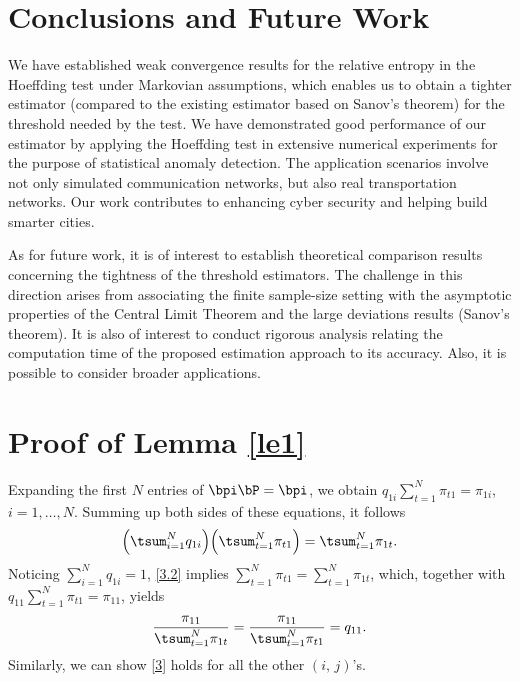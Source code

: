 \documentclass[10pt, twocolumn]{IEEEtran}
\begin{document}
\section{Conclusions and Future Work} \label{sec:con}

We have established weak convergence results for the relative entropy in
the Hoeffding test under Markovian assumptions, which enables us to
obtain a {tighter} estimator (compared to the existing estimator based on
Sanov's theorem) for the threshold needed by the test. We have
demonstrated good performance of our estimator by applying the Hoeffding
test in extensive numerical experiments for the purpose of statistical
anomaly detection. The application scenarios involve not only simulated
communication networks, but also real transportation networks. Our work
contributes to enhancing cyber security and helping build smarter
cities.

As for future work, it is of interest to establish theoretical comparison results concerning the tightness of the threshold estimators. The challenge in this direction arises from associating the finite sample-size setting with the asymptotic properties of the Central Limit Theorem and the large deviations results (Sanov's theorem). It is also of interest to conduct rigorous analysis  relating the computation time of the proposed estimation approach to its accuracy. Also, it is possible to consider broader applications.

\appendices
{}

\section{Proof of Lemma \ref{le1}} \label{sec:lem1}

Expanding the first $N$ entries of ${\bpi} \bP = {\bpi}$, we obtain
$q_{1i}\sum_{t = 1}^N {{\pi _{t1}}} = {\pi _{1i}}$, $i = 1,
\ldots, N$.  Summing up both sides of these equations, it follows
\begin{equation}
 \Big( \tsum_{i = 1}^N q_{1i}\Big) \Big( \tsum_{t = 1}^N \pi _{t1}\Big)
 = \tsum_{t = 1}^N \pi _{1t}.  \label{3.2} 
\end{equation}
Noticing $\sum_{i = 1}^N q_{1i} = 1$, \eqref{3.2} implies $\sum_{t =
  1}^N {{\pi _{t1}}} = \sum_{t = 1}^N {{\pi _{1t}}}$, which, together
with $q_{11}\sum_{t = 1}^N {{\pi _{t1}}} = {\pi _{11}}$, yields
\[
\frac{{{\pi _{11}}}}{{\tsum_{t = 1}^N {{\pi _{1t}}} }} = \frac{{{\pi
      _{11}}}}{{\tsum_{t = 1}^N {{\pi _{t1}}} }} = {q_{11}}.
\]
Similarly, we can show \eqref{3} holds for all the other $(i,\,j)$'s.
\end{document}
